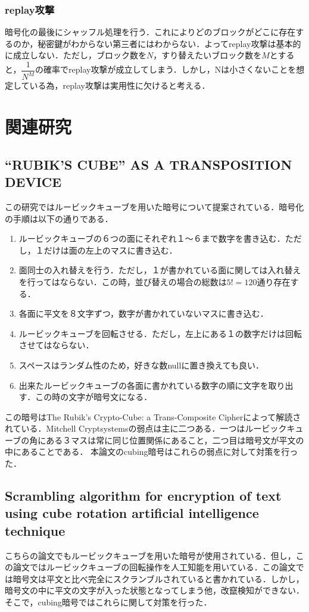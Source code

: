 \documentclass{jsarticle}
\begin{document}
\subsubsection{replay攻撃}
暗号化の最後にシャッフル処理を行う．これによりどのブロックがどこに存在するのか，秘密鍵がわからない第三者にはわからない．よってreplay攻撃は基本的に成立しない．ただし，ブロック数を$N$，すり替えたいブロック数を$M$とすると，$\dfrac{1}{N^M}$の確率でreplay攻撃が成立してしまう．しかし，Nは小さくないことを想定している為，replay攻撃は実用性に欠けると考える．

\section{関連研究}
\subsection{“RUBIK'S CUBE” AS A TRANSPOSITION DEVICE}
この研究ではルービックキューブを用いた暗号について提案されている．\cite{Mitchell}暗号化の手順は以下の通りである．
\begin{enumerate}
  \item ルービックキューブの６つの面にそれぞれ１〜６まで数字を書き込む．ただし，１だけは面の左上のマスに書き込む．
  \item 面同士の入れ替えを行う．ただし，１が書かれている面に関しては入れ替えを行ってはならない．この時，並び替えの場合の総数は$5!=120$通り存在する．
  \item 各面に平文を８文字ずつ，数字が書かれていないマスに書き込む．
  \item ルービックキューブを回転させる．ただし，左上にある１の数字だけは回転させてはならない．
  \item スペースはランダム性のため，好きな数nullに置き換えても良い．
  \item 出来たルービックキューブの各面に書かれている数字の順に文字を取り出す．この時の文字が暗号文になる．
\end{enumerate}

この暗号はThe Rubik's Crypto-Cube: a Trans-Composite Cipher\cite{Trans-Composite Cipher}によって解読されている．Mitchell Cryptsystemsの弱点は主に二つある．一つはルービックキューブの角にある３マスは常に同じ位置関係にあること，二つ目は暗号文が平文の中にあることである．
本論文のcubing暗号はこれらの弱点に対して対策を行った．


\subsection{Scrambling algorithm for encryption of text using cube rotation artificial intelligence technique}
\cite{Scrambling algorithm}
こちらの論文でもルービックキューブを用いた暗号が使用されている．但し，この論文ではルービックキューブの回転操作を人工知能を用いている．この論文では暗号文は平文と比べ完全にスクランブルされていると書かれている．しかし，暗号文の中に平文の文字が入った状態となってしまう他，改竄検知ができない．そこで，cubing暗号ではこれらに関して対策を行った．
\end{document}
